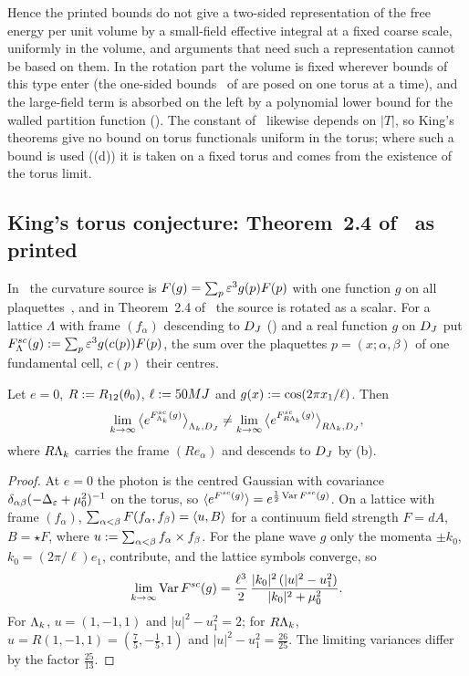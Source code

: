 Hence the printed bounds do not give a two-sided representation of the free energy per unit volume by a small-field effective integral at a fixed coarse scale, uniformly in the volume, and arguments that need such a representation cannot be based on them. In the rotation part the volume is fixed wherever bounds of this type enter (the one-sided bounds \hypF\ of  are posed on one torus at a time), and the large-field term is absorbed on the left by a polynomial lower bound for the walled partition function (). The constant of~\cite[Thm.~2.1(ii)]{K1} likewise depends on $|T|$, so King's theorems give no bound on torus functionals uniform in the torus; where such a bound is used ((d)) it is taken on a fixed torus and comes from the existence of the torus limit.

\subsection{King's torus conjecture: Theorem~2.4 of~\cite{K2} as printed}

In~\cite{K1,K2} the curvature source is $F(g)=\sum_p\varepsilon^3g(p)F(p)$ with one function $g$ on all plaquettes~\cite[(2.12)]{K2}, and in Theorem~2.4 of~\cite{K2} the source is rotated as a scalar. For a lattice $\Lambda$ with frame $(f_\alpha)$ descending to $D_J$ () and a real function $g$ on $D_J$ put $F^{sc}_\Lambda(g):=\sum_p\varepsilon^3g(c(p))F(p)$, the sum over the plaquettes $p=(x;\alpha,\beta)$ of one fundamental cell, $c(p)$ their centres.

\begin{proposition}\label{rot:prop:scalar}
Let $e=0$, $R:= R_{12}(\theta_0)$, $\ell:=50MJ$ and $g(x):=\cos(2\pi x_1/\ell)$. Then
\[
\lim_{k\to\infty}\big\langle e^{F^{sc}_{\Lambda_k}(g)}\big\rangle_{\Lambda_k,D_J}\ne\lim_{k\to\infty}\big\langle e^{F^{sc}_{R\Lambda_k}(g)}\big\rangle_{R\Lambda_k,D_J},
\]
where $R\Lambda_k$ carries the frame $(Re_\alpha)$ and descends to $D_J$ by (b).
\end{proposition}

\begin{proof}
At $e=0$ the photon is the centred Gaussian with covariance $\delta_{\alpha\beta}(-\Delta_{\varepsilon}+\mu_0^2)^{-1}$ on the torus, so $\langle e^{F^{sc}(g)}\rangle=e^{\frac12\operatorname{Var} F^{sc}(g)}$. On a lattice with frame $(f_\alpha)$, $\sum_{\alpha<\beta}F(f_\alpha,f_\beta)=\langle u,B\rangle$ for a continuum field strength $F=dA$, $B=\star F$, where $u:=\sum_{\alpha<\beta}f_\alpha\times f_\beta$. For the plane wave $g$ only the momenta $\pm k_0$, $k_0=(2\pi/\ell)e_1$, contribute, and the lattice symbols converge, so
\[
\lim_{k\to\infty}\operatorname{Var} F^{sc}(g)=\frac{\ell^3}2\,\frac{|k_0|^2\,(|u|^2-u_1^2)}{|k_0|^2+\mu_0^2}.
\]
For $\Lambda_k$, $u=(1,-1,1)$ and $|u|^2-u_1^2=2$; for $R\Lambda_k$, $u=R(1,-1,1)=(\frac75,-\frac15,1)$ and $|u|^2-u_1^2=\frac{26}{25}$. The limiting variances differ by the factor $\frac{25}{13}$.
\end{proof}


